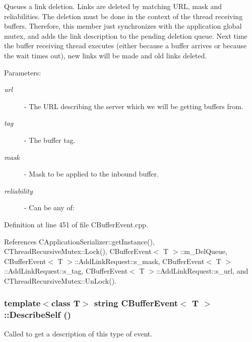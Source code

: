Queues a link deletion. Links are deleted by matching URL, mask and  reliabilities. The deletion must be done in the context of the thread receiving buffers. Therefore, this member just synchronizes with the application global mutex, and adds the link description to the pending deletion queue. Next time the buffer receiving thread executes (either because a buffer arrives or because the wait times out), new links will be made and old links deleted.\begin{Desc}
\item[Parameters: ]\par
\begin{description}
\item[{\em 
url}]- The URL describing the server which we will be getting buffers from. \item[{\em 
tag}]- The buffer tag. \item[{\em 
mask}]- Mask to be applied to the inbound buffer. \item[{\em 
reliability}]- Can be any of:
\end{description}
\end{Desc}


Definition at line 451 of file CBuffer\-Event.cpp.

References CApplication\-Serializer::get\-Instance(), CThread\-Recursive\-Mutex::Lock(), CBuffer\-Event$<$ T $>$::m\_\-Del\-Queue, CBuffer\-Event$<$ T $>$::Add\-Link\-Request::s\_\-mask, CBuffer\-Event$<$ T $>$::Add\-Link\-Request::s\_\-tag, CBuffer\-Event$<$ T $>$::Add\-Link\-Request::s\_\-url, and CThread\-Recursive\-Mutex::Un\-Lock().
\subsubsection{\setlength{\rightskip}{0pt plus 5cm}template$<$class T$>$ string CBuffer\-Event$<$ T $>$::Describe\-Self ()\hspace{0.3cm}{\tt  [virtual]}}\label{classCBufferEvent_a14}


Called to get a description of this type of event. 

